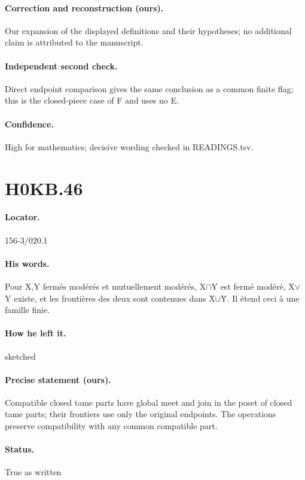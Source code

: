 \paragraph{Correction and reconstruction (ours).} Our expansion of the displayed definitions and their hypotheses; no additional claim is attributed to the manuscript.

\paragraph{Independent second check.} Direct endpoint comparison gives the same conclusion as a common finite flag; this is the closed-piece case of F and uses no E.

\paragraph{Confidence.} High for mathematics; decisive wording checked in READINGS.tsv.

\section*{H0KB.46}\label{statement:H0KB.46}
\paragraph{Locator.} 156-3/020.1

\paragraph{His words.} Pour X,Y fermés modérés et mutuellement modérés, X\ensuremath{\cap}Y est fermé modéré, X\ensuremath{\vee}Y existe, et les frontières des deux sont contenues dans Ẋ\ensuremath{\cup}Ẏ. Il étend ceci à une famille finie.

\paragraph{How he left it.} sketched

\paragraph{Precise statement (ours).} Compatible closed tame parts have global meet and join in the poset of closed tame parts; their frontiers use only the original endpoints. The operations preserve compatibility with any common compatible part.

\paragraph{Status.} True as written

